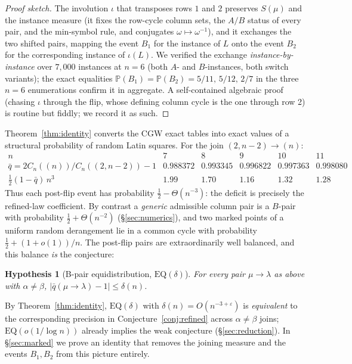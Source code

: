 \documentclass[11pt]{article}
\newtheorem{hypothesis}[theorem]{Hypothesis}
\theoremstyle{definition}
\renewcommand{\Pr}{\mathbb{P}}
\newcommand{\CC}{C}
\begin{document}
\begin{proof}[Proof sketch]
The involution $\iota$ that transposes rows $1$ and $2$ preserves $S(\mu)$
and the instance measure (it fixes the row-cycle column sets, the $A/B$
status of every pair, and the min-symbol rule, and conjugates
$\omega\mapsto\omega^{-1}$), and it exchanges the two shifted pairs, mapping
the event $B_1$ for the instance of $L$ onto the event $B_2$ for the
corresponding instance of $\iota(L)$.  We verified the exchange
\emph{instance-by-instance} over $7{,}000$ instances at $n=6$ (both $A$- and
$B$-instances, both switch variants); the exact equalities
$\Pr(B_1)=\Pr(B_2)=5/11,\,5/12,\,2/7$ in the three $n=6$ enumerations confirm
it in aggregate.  A self-contained algebraic proof (chasing $\iota$ through
the flip, whose defining column cycle is the one through row 2) is routine
but fiddly; we record it as such.
\end{proof}

Theorem~\ref{thm:identity} converts the CGW exact tables into exact values
of a structural probability of random Latin squares.  For the join
$(2,n-2)\to(n)$:
\[
\begin{array}{l|lllll}
n & 7 & 8 & 9 & 10 & 11\\\hline
\bar q = 2\CC_n((n))/\CC_n((2,n-2))-1
& 0.988372 & 0.993345 & 0.996822 & 0.997363 & 0.998080\\
\tfrac12(1-\bar q)\,n^{3} & 1.99 & 1.70 & 1.16 & 1.32 & 1.28
\end{array}
\]
Thus each post-flip event has probability
$\tfrac12-\Theta(n^{-3})$: the deficit is precisely the refined-law
coefficient.  By contrast a \emph{generic} admissible column pair is a
$B$-pair with probability $\tfrac12+\Theta(n^{-2})$
(\S\ref{sec:numerics}), and two marked points of a uniform random
derangement lie in a common cycle with probability
$\tfrac12+(1+o(1))/n$.  The post-flip pairs are extraordinarily well
balanced, and this balance \emph{is} the conjecture:

\begin{hypothesis}[B-pair equidistribution, $\mathrm{EQ}(\delta)$]\label{hyp:eq}
For every pair $\mu\to\lambda$ as above with $\alpha\neq\beta$,
$\bigl|\bar q(\mu\to\lambda)-1\bigr|\le\delta(n)$.
\end{hypothesis}

By Theorem~\ref{thm:identity}, $\mathrm{EQ}(\delta)$ with
$\delta(n)=O(n^{-3+\varepsilon})$ is \emph{equivalent} to the corresponding
precision in Conjecture~\ref{conj:refined} across $\alpha\neq\beta$ joins;
$\mathrm{EQ}(o(1/\log n))$ already implies the weak conjecture
(\S\ref{sec:reduction}).  In \S\ref{sec:marked} we prove an identity
that removes the joining measure and the events $B_1,B_2$ from this
picture entirely.
\end{document}
